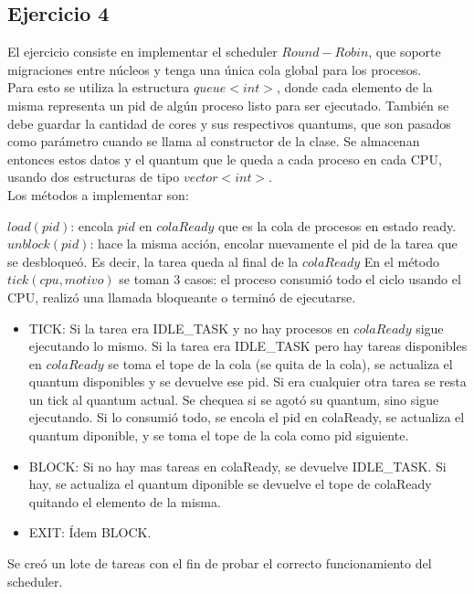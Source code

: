 \subsection{Ejercicio 4}

El ejercicio consiste en implementar el scheduler $Round-Robin$, que soporte migraciones entre núcleos y tenga una única cola global
para los procesos. \\

Para esto se utiliza la estructura $queue<int>$, donde cada elemento de la misma representa un pid de algún proceso listo para ser ejecutado.
También se debe guardar la cantidad de cores y sus respectivos quantums, que son pasados como parámetro cuando se llama al constructor de la clase. 
Se almacenan entonces estos datos y el quantum que le queda a cada proceso en cada CPU, usando dos estructuras de tipo $vector<int>$.\\

Los métodos a implementar son:
 
$load(pid)$: encola $pid$ en $colaReady$ que es la cola de procesos en estado ready.
$unblock(pid)$: hace la misma acción, encolar nuevamente el pid de la tarea que se desbloqueó. Es decir, la tarea queda al final de la $colaReady$
En el método $tick(cpu, motivo)$ se toman 3 casos: el proceso consumió todo el ciclo usando el CPU, realizó una llamada bloqueante o terminó
 de ejecutarse. \\

\begin{itemize}
\item TICK: Si la tarea era IDLE_TASK y no hay procesos en $colaReady$ sigue ejecutando lo mismo.
			Si la tarea era IDLE_TASK pero hay tareas disponibles en $colaReady$ se toma el tope de la cola (se quita de la cola), se actualiza el quantum disponibles
			 y se devuelve ese pid.
			Si era cualquier otra tarea se resta un tick al quantum actual. Se chequea si se agotó su quantum, sino sigue ejecutando. Si lo consumió todo, se encola 
			el pid en colaReady, se actualiza el quantum diponible, y se toma el tope de la cola como pid siguiente.
\item BLOCK: Si no hay mas tareas en colaReady, se devuelve IDLE_TASK.
				Si hay, se actualiza el quantum diponible se devuelve el tope de colaReady quitando el elemento de la misma.
\item EXIT: Ídem BLOCK.
\end{itemize}

Se creó un lote de tareas con el fin de probar el correcto funcionamiento del scheduler.

